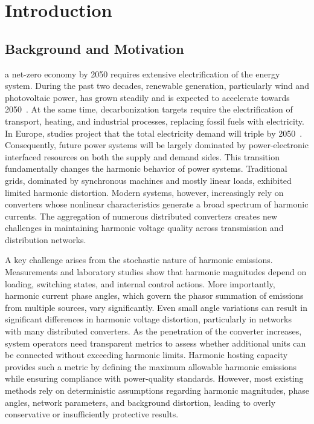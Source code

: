 \section{Introduction}
\label{sec:introduction}

\subsection{Background and Motivation}
\label{sec:background_and_motivation}

 a net-zero economy by 2050 requires extensive electrification of the energy system. During the past two decades, renewable generation, particularly wind and photovoltaic power, has grown steadily and is expected to accelerate towards 2050~\cite{international_energy_agency_world_2023}. At the same time, decarbonization targets require the electrification of transport, heating, and industrial processes, replacing fossil fuels with electricity. In Europe, studies project that the total electricity demand will triple by 2050~\cite{energyville_paths_2023}. Consequently, future power systems will be largely dominated by power-electronic interfaced resources on both the supply and demand sides. This transition fundamentally changes the harmonic behavior of power systems. Traditional grids, dominated by synchronous machines and mostly linear loads, exhibited limited harmonic distortion. Modern systems, however, increasingly rely on converters whose nonlinear characteristics generate a broad spectrum of harmonic currents. The aggregation of numerous distributed converters creates new challenges in maintaining harmonic voltage quality across transmission and distribution networks.

A key challenge arises from the stochastic nature of harmonic emissions. Measurements and laboratory studies show that harmonic magnitudes depend on loading, switching states, and internal control actions. More importantly, harmonic current phase angles, which govern the phasor summation of emissions from multiple sources, vary significantly. Even small angle variations can result in significant differences in harmonic voltage distortion, particularly in networks with many distributed converters. As the penetration of the converter increases, system operators need transparent metrics to assess whether additional units can be connected without exceeding harmonic limits. Harmonic hosting capacity provides such a metric by defining the maximum allowable harmonic emissions while ensuring compliance with power-quality standards. However, most existing methods rely on deterministic assumptions regarding harmonic magnitudes, phase angles, network parameters, and background distortion, leading to overly conservative or insufficiently protective results.

